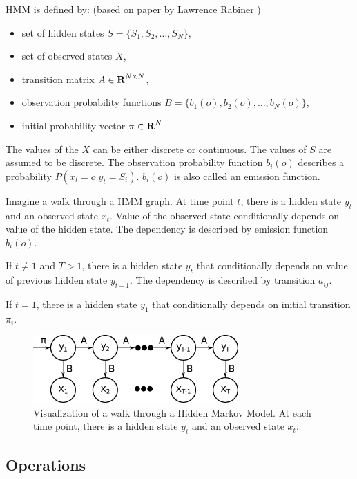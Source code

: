 \documentclass[thesis=B,english]{FITthesis}[2012/06/26]
\begin{document}
HMM is defined by: (based on paper by Lawrence Rabiner \cite{hmm-lawrence})
\begin{itemize}

\item set of hidden states $S = \{S_1, S_2, \dots, S_N\}$,
\item set of observed states $X$,
\item transition matrix $A \in \textbf R^{N \times N}$,
\item observation probability functions $B = \{b_1(o), b_2(o), \dots, b_N(o)\}$,
\item initial probability vector $\pi \in \textbf R^N$.

\end{itemize}

The values of the $X$ can be either discrete or continuous. The values of $S$ are assumed to be discrete. The observation probability function $b_i(o)$ describes a probability $P(x_t = o | y_t = S_i)$. $b_i(o)$ is also called an emission function.

Imagine a walk through a HMM graph. At time point $t$, there is a hidden state $y_t$ and an observed state $x_t$. Value of the observed state conditionally depends on value of the hidden state. The dependency is described by emission function $b_i(o)$.

If $t \neq 1$ and $T > 1$, there is a hidden state $y_t$ that conditionally depends on value of previous hidden state $y_{t-1}$. The dependency is described by transition $a_{ij}$.

If $t = 1$, there is a hidden state $y_1$ that conditionally depends on initial transition $\pi_i$.

\begin{figure}
	\centering
 	\includegraphics[width=0.7\textwidth]{hmm}
 	\caption{Visualization of a walk through a Hidden Markov Model. At each time point, there is a hidden state $y_t$ and an observed state $x_t$.}
 	\label{fig:hmm}
\end{figure}

\subsection{Operations}
\end{document}
